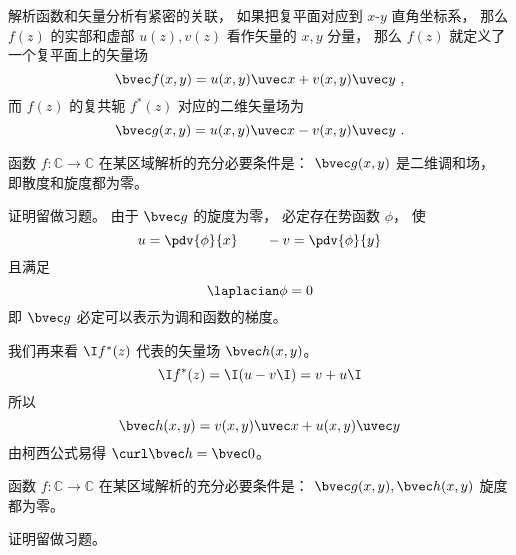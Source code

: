 

解析函数和矢量分析有紧密的关联， 如果把复平面对应到 $x$-$y$ 直角坐标系， 那么 $f(z)$ 的实部和虚部 $u(z), v(z)$ 看作矢量的 $x,y$ 分量， 那么 $f(z)$ 就定义了一个复平面上的矢量场
\begin{equation}
\bvec f(x,y) = u(x,y)\uvec x + v(x,y)\uvec y~,
\end{equation}
而 $f(z)$ 的复共轭 $f^*(z)$ 对应的二维矢量场为
\begin{equation}
\bvec g(x,y) = u(x,y)\uvec x - v(x,y)\uvec y~.
\end{equation}

\begin{theorem}{}
函数 $f:\mathbb C\to\mathbb C$ 在某区域解析的充分必要条件是： $\bvec g(x,y)$ 是二维调和场， 即散度和旋度都为零。
\end{theorem}
证明留做习题。 由于 $\bvec g$ 的旋度为零， 必定存在势函数 $\phi$， 使
\begin{equation}
u = \pdv{\phi}{x} \qquad -v = \pdv{\phi}{y}
\end{equation}
且满足
\begin{equation}
\laplacian \phi = 0
\end{equation}
即 $\bvec g$ 必定可以表示为调和函数的梯度。

我们再来看 $\I f^*(z)$ 代表的矢量场 $\bvec h(x,y)$。
\begin{equation}
\I f^*(z) = \I (u - v\I) = v + u\I
\end{equation}
所以
\begin{equation}
\bvec h(x,y) = v(x,y)\uvec x + u(x,y)\uvec y
\end{equation}
由柯西公式易得 $\curl \bvec h = \bvec 0$。

\begin{theorem}{}
函数 $f:\mathbb C\to\mathbb C$ 在某区域解析的充分必要条件是： $\bvec g(x,y), \bvec h(x,y)$ 旋度都为零。
\end{theorem}
证明留做习题。
